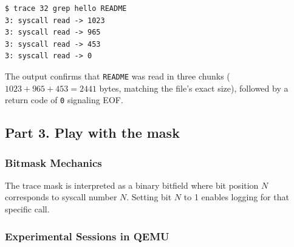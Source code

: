 \documentclass{labreport}
\begin{document}
\begin{lstlisting}[style=bash]
$ trace 32 grep hello README
3: syscall read -> 1023
3: syscall read -> 965
3: syscall read -> 453
3: syscall read -> 0
\end{lstlisting}
The output confirms that \texttt{README} was read in three chunks ($1023 + 965 + 453 = 2441$ bytes, matching the file's exact size), followed by a return code of \texttt{0} signaling EOF.

\subsection{Part 3. Play with the mask}

\subsubsection{Bitmask Mechanics}
The trace mask is interpreted as a binary bitfield where bit position $N$ corresponds to syscall number $N$. Setting bit $N$ to 1 enables logging for that specific call.

\subsubsection{Experimental Sessions in QEMU}
\end{document}
